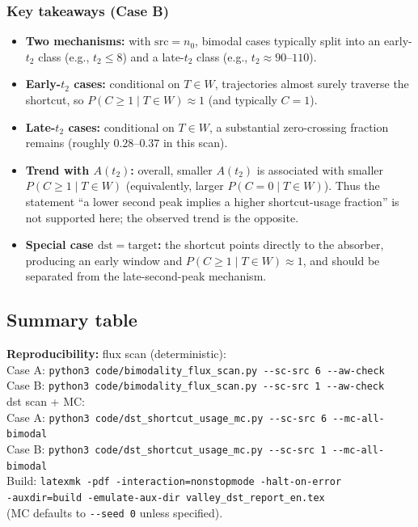 \documentclass[11pt]{article}
\newcommand{\CaseBInDir}{inputs/caseB}
\begin{document}
\subsubsection{Key takeaways (Case B)}
\begin{itemize}
  \item \textbf{Two mechanisms:} with $\mathrm{src}=n_0$, bimodal cases typically split into an early-$t_2$ class (e.g., $t_2\le 8$) and a late-$t_2$ class (e.g., $t_2\approx 90$--$110$).
  \item \textbf{Early-$t_2$ cases:} conditional on $T\in W$, trajectories almost surely traverse the shortcut, so $P(C\ge 1\mid T\in W)\approx 1$ (and typically $C=1$).
  \item \textbf{Late-$t_2$ cases:} conditional on $T\in W$, a substantial zero-crossing fraction remains (roughly $0.28$--$0.37$ in this scan).
  \item \textbf{Trend with $A(t_2)$:} overall, smaller $A(t_2)$ is associated with smaller $P(C\ge 1\mid T\in W)$ (equivalently, larger $P(C=0\mid T\in W)$). Thus the statement ``a lower second peak implies a higher shortcut-usage fraction'' is not supported here; the observed trend is the opposite.
  \item \textbf{Special case $\mathrm{dst}=\mathrm{target}$:} the shortcut points directly to the absorber, producing an early window and $P(C\ge 1\mid T\in W)\approx 1$, and should be separated from the late-second-peak mechanism.
\end{itemize}

\subsection{Summary table}
{\scriptsize
\centering
\setlength{\tabcolsep}{3pt}
\renewcommand{\arraystretch}{0.85}

\par}

{\footnotesize
\noindent\textbf{Reproducibility:}
flux scan (deterministic):\\
Case A: \verb|python3 code/bimodality_flux_scan.py --sc-src 6 --aw-check|\\
Case B: \verb|python3 code/bimodality_flux_scan.py --sc-src 1 --aw-check|\\
dst scan + MC:\\
Case A: \verb|python3 code/dst_shortcut_usage_mc.py --sc-src 6 --mc-all-bimodal|\\
Case B: \verb|python3 code/dst_shortcut_usage_mc.py --sc-src 1 --mc-all-bimodal|\\
Build: \texttt{latexmk -pdf -interaction=nonstopmode -halt-on-error}\\
\phantom{Build: }\texttt{-auxdir=build -emulate-aux-dir valley\_dst\_report\_en.tex}\\
(MC defaults to \verb|--seed 0| unless specified).
}
\end{document}
